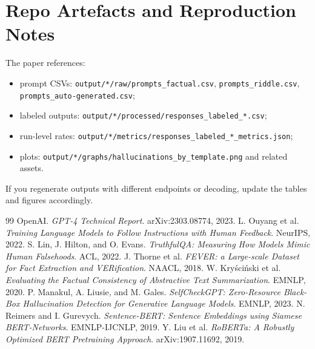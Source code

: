 \documentclass[11pt]{article}
\begin{document}
\section{Repo Artefacts and Reproduction Notes}
The paper references:
\begin{itemize}[leftmargin=1.4em]
  \item prompt CSVs: \texttt{output/*/raw/prompts\_factual.csv}, \texttt{prompts\_riddle.csv}, \texttt{prompts\_auto-generated.csv};
  \item labeled outputs: \texttt{output/*/processed/responses\_labeled\_*.csv};
  \item run-level rates: \texttt{output/*/metrics/responses\_labeled\_*\_metrics.json};
  \item plots: \texttt{output/*/graphs/hallucinations\_by\_template.png} and related assets.
\end{itemize}
If you regenerate outputs with different endpoints or decoding, update the tables and figures accordingly.

\begin{thebibliography}{99}
 OpenAI. \textit{GPT-4 Technical Report}. arXiv:2303.08774, 2023.
 L. Ouyang et al. \textit{Training Language Models to Follow Instructions with Human Feedback}. NeurIPS, 2022.
 S. Lin, J. Hilton, and O. Evans. \textit{TruthfulQA: Measuring How Models Mimic Human Falsehoods}. ACL, 2022.
 J. Thorne et al. \textit{FEVER: a Large-scale Dataset for Fact Extraction and VERification}. NAACL, 2018.
 W. Kry{\'s}ci{\'n}ski et al. \textit{Evaluating the Factual Consistency of Abstractive Text Summarization}. EMNLP, 2020.
 P. Manakul, A. Liusie, and M. Gales. \textit{SelfCheckGPT: Zero-Resource Black-Box Hallucination Detection for Generative Language Models}. EMNLP, 2023.
 N. Reimers and I. Gurevych. \textit{Sentence-BERT: Sentence Embeddings using Siamese BERT-Networks}. EMNLP-IJCNLP, 2019.
 Y. Liu et al. \textit{RoBERTa: A Robustly Optimized BERT Pretraining Approach}. arXiv:1907.11692, 2019.
\end{thebibliography}
\end{document}
